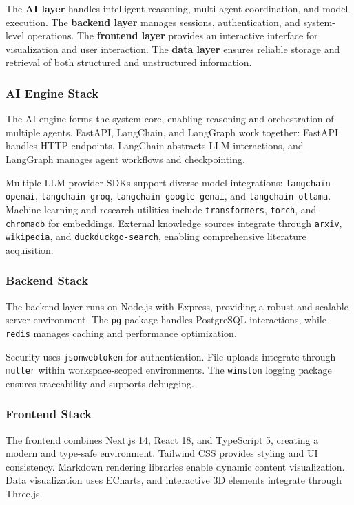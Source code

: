 \documentclass[12pt, a4paper]{article}
\begin{document}
The \textbf{AI layer} handles intelligent reasoning, multi-agent coordination, and model execution. The \textbf{backend layer} manages sessions, authentication, and system-level operations. The \textbf{frontend layer} provides an interactive interface for visualization and user interaction. The \textbf{data layer} ensures reliable storage and retrieval of both structured and unstructured information.

\subsubsection*{AI Engine Stack}

The AI engine forms the system core, enabling reasoning and orchestration of multiple agents. FastAPI, LangChain, and LangGraph work together: FastAPI handles HTTP endpoints, LangChain abstracts LLM interactions, and LangGraph manages agent workflows and checkpointing.

Multiple LLM provider SDKs support diverse model integrations: \texttt{langchain-openai}, \texttt{langchain-groq}, \texttt{langchain-google-genai}, and \texttt{langchain-ollama}. Machine learning and research utilities include \texttt{transformers}, \texttt{torch}, and \texttt{chromadb} for embeddings. External knowledge sources integrate through \texttt{arxiv}, \texttt{wikipedia}, and \texttt{duckduckgo-search}, enabling comprehensive literature acquisition.

\subsubsection*{Backend Stack}

The backend layer runs on Node.js with Express, providing a robust and scalable server environment. The \texttt{pg} package handles PostgreSQL interactions, while \texttt{redis} manages caching and performance optimization.

Security uses \texttt{jsonwebtoken} for authentication. File uploads integrate through \texttt{multer} within workspace-scoped environments. The \texttt{winston} logging package ensures traceability and supports debugging.

\subsubsection*{Frontend Stack}

The frontend combines Next.js 14, React 18, and TypeScript 5, creating a modern and type-safe environment. Tailwind CSS provides styling and UI consistency. Markdown rendering libraries enable dynamic content visualization. Data visualization uses ECharts, and interactive 3D elements integrate through Three.js.
\end{document}
